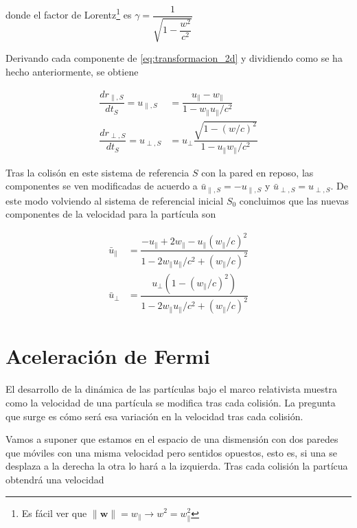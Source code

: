 \documentclass[11pt, spanish]{book}
\begin{document}
donde el factor de Lorentz\footnote{Es fácil ver que \( \lVert \mathbf{w} \rVert = w_\parallel \rightarrow w^2 = w_\parallel^2 \)} es \( \gamma = \dfrac{1}{\sqrt{1 - \dfrac{w^2}{c^2}}} \)

\vspace{6mm}

Derivando cada componente de \ref{eq:transformacion_2d} y dividiendo como se ha hecho anteriormente, se obtiene

\begin{align}
    \dfrac{dr_{\parallel, S}}{dt_S} = u_{\parallel,S} &= \dfrac{u_\parallel - w_\parallel}{1 - w_\parallel u_\parallel / c^2} \label{eq:velocity_change1}\\[2mm]
    \dfrac{dr_{\perp, S}}{dt_S} = u_{\perp,S} &= u_\perp\dfrac{\sqrt{1 - {(w/c)}^2}}{1 - u_\parallel w_\parallel / c^2} \label{eq:velocity_change2}
\end{align}

Tras la colisón en este sistema de referencia \( S \) con la pared en reposo, las componentes se ven modificadas de acuerdo a \( \bar{u}_{\parallel, S} = -u_{\parallel, S} \) y \( \bar{u}_{\perp, S} = u_{\perp, S} \). De este modo volviendo al sistema de referencial inicial \( S_0 \) concluimos que las nuevas componentes de la velocidad para la partícula son

\begin{align}
    \bar{u}_\parallel &= \dfrac{-u_\parallel + 2w_\parallel - u_\parallel(w_\parallel/c)^2}{1 - 2w_\parallel u_\parallel / c^2 + (w_\parallel/c)^2} \label{eq:velocidad_paralela}\\[2mm]
    \bar{u}_\perp &= \dfrac{u_\perp\left(1 - (w_\parallel/c)^2\right)}{1 - 2w_\parallel u_\parallel / c^2 + (w_\parallel/c)^2}\label{eq:velocidad_perpendicular}
\end{align}

\section{Aceleración de Fermi}

El desarrollo de la dinámica de las partículas bajo el marco relativista muestra como la velocidad de una partícula se modifica tras cada colisión. La pregunta que surge es cómo será esa variación en la velocidad tras cada colisión.  

\vspace{3mm}

Vamos a suponer que estamos en el espacio de una dismensión con dos paredes que móviles con una misma velocidad pero sentidos opuestos, esto es, si una se desplaza a la derecha la otra lo hará a la izquierda. Tras cada colisión la partícua obtendrá una velocidad
\end{document}

